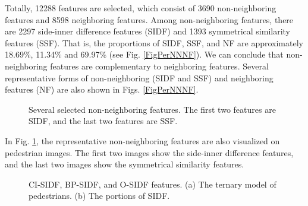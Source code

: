 \documentclass[10pt,twocolumn,letterpaper]{article}
\begin{document}
Totally, 12288 features are selected, which consist of 3690 
non-neighboring features and 8598 neighboring features. Among 
non-neighboring features, there are 2297 side-inner difference features 
(SIDF) and 1393 symmetrical similarity features (SSF). That is, the 
proportions of SIDF, SSF, and NF are approximately 18.69{\%}, 11.34{\%} and 
69.97{\%} (see Fig. \ref{FigPerNNNF}). We can conclude that non-neighboring features are 
complementary to neighboring features. Several representative forms of 
non-neighboring (SIDF and SSF) and neighboring features (NF) are also shown 
in Figs. \ref{FigPerNNNF}. 

\begin{figure}[!t]
\centering
{}
\hfil
{}
\hfil
{}
\hfil
{}
\caption{Several selected non-neighboring features. The first two features are SIDF, and the last two features are SSF.}
\label{FigSIDFSSF}
\end{figure}


In Fig. \ref{FigSIDFSSF}, the representative non-neighboring features are also visualized 
on pedestrian images. The first two images show the side-inner difference 
features, and the last two images show the symmetrical similarity features.


\begin{figure}[!t]
\centering
{}
\hfil
{}
\caption{CI-SIDF, BP-SIDF, and O-SIDF features. (a) The ternary model of pedestrians. (b) The portions of SIDF.}
\label{FigPerSIDF}
\end{figure}
\end{document}
